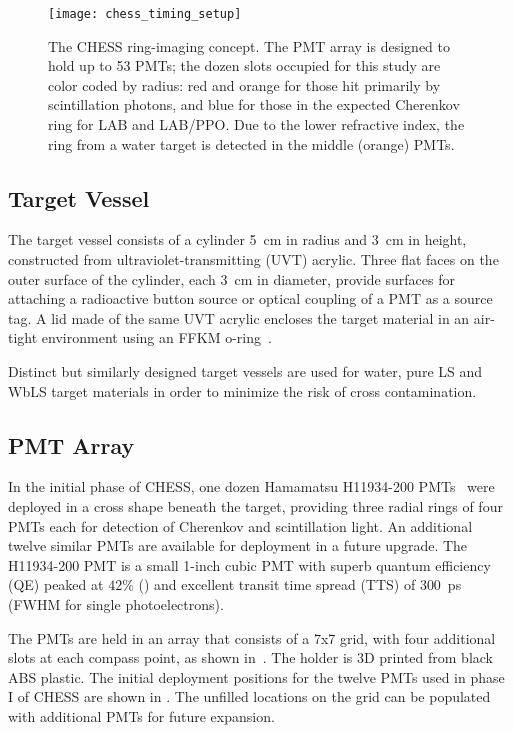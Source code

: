 \begin{figure}
\centering
\texttt{[image: chess\_timing\_setup]}
\caption{The CHESS ring-imaging concept. The PMT array is designed to hold up to 53 PMTs; the dozen slots occupied for this study are color coded by radius: red and orange for those hit primarily by scintillation photons, and blue for those in the expected Cherenkov ring for LAB and LAB/PPO. Due to the lower refractive index, the ring from a water target is detected in the middle (orange) PMTs. }
\label{fig:timing-setup-2}
\end{figure}

\subsection{Target Vessel}
The target vessel  consists of a cylinder 5~cm in radius and 3~cm in height, constructed from ultraviolet-transmitting (UVT) acrylic. Three flat faces on the outer surface of the cylinder, each 3~cm in diameter, provide surfaces for attaching a radioactive button source or optical coupling of a PMT as a source tag. A lid made of the same UVT acrylic encloses the target material in an air-tight environment using an FFKM o-ring~\cite{cog-oring}. 

Distinct but similarly designed target vessels are used for water, pure LS and WbLS target materials in order to minimize the risk of cross contamination.

\subsection{PMT Array}

\label{pmtarray}
In the initial phase of CHESS, one dozen Hamamatsu H11934-200 PMTs~\cite{h11934} were deployed in a cross shape beneath the target, providing three radial rings of four PMTs each for detection of Cherenkov and scintillation light.  An additional twelve similar PMTs are available for deployment in a future upgrade.  The H11934-200 PMT is a small 1-inch cubic PMT with superb quantum efficiency (QE) peaked at $42\%$ () and excellent transit time spread (TTS) of 300~ps (FWHM for single photoelectrons).

The PMTs are held in an array that consists of a 7x7 grid, with four additional slots at each compass point, as shown in~.  The holder is 3D printed from black ABS plastic.  The initial deployment positions for the twelve PMTs used in phase I of CHESS are shown in .
The unfilled locations on the grid can be populated with additional PMTs for future expansion. 


